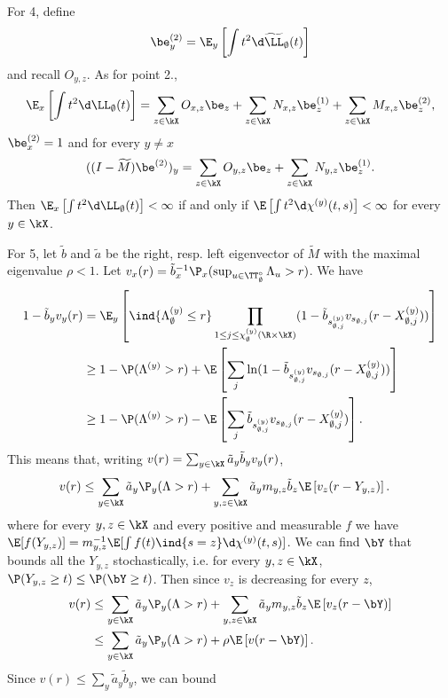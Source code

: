 \documentclass[10pt,a4paper]{article}
\newcommand{\wM}{\widetilde{M}}
\renewcommand{\kx}{s}
\begin{document}
For 4, define
\[ \be^{(2)}_y = \E_y\left[\int t^2 \d\widetilde\LL_\emptyset(t)\right] \]
and recall $O_{y,z}$. 
As for point 2., 
\[ \E_x\left[ \int t^2 \d\LL_\emptyset(t) \right] = \sum_{z\in\kX} O_{x,z} \be_z + \sum_{z\in\kX} N_{x,z} \be^{(1)}_z + \sum_{z\in\kX} M_{x,z} \be^{(2)}_z , \]
$\be^{(2)}_x = 1$ and for every $y\neq x$
\[ ((I-\wM) \be^{(2)})_y = \sum_{z\in\kX} O_{y,z} \be_z + \sum_{z\in\kX} N_{y,z} \be^{(1)}_z . \]
Then $\E_x\left[\int t^2\d\LL_\emptyset(t)\right]<\infty$ if and only if $\E\left[\int t^2 \d\chi^{(y)}(t,\kx)\right]<\infty$ for every $y\in\kX$. 


For 5, let $\tilde b$ and $\tilde a$ be the right, resp. left eigenvector of $\wM$ with the maximal eigenvalue $\rho<1$. 
Let $v_x(r) = \tilde b_x^{-1} \P_x(\sup_{u\in\TT^\circ_\emptyset} \Lambda_u > r)$. We have
\begin{align*}
1-\tilde b_y v_y(r) &= \E_y\left[\ind{\Lambda^{(y)}_{\emptyset}\leq r} \prod_{1\leq j \leq\chi^{(y)}_\emptyset(\R\times\kX)} (1-\tilde b_{\kx^{(y)}_{\emptyset,j}} v_{\kx_{\emptyset,j}}(r-X^{(y)}_{\emptyset,j})) \right] \\
&\geq 1 - \P(\Lambda^{(y)}>r) + \E\left[ \sum_j \ln(1-\tilde b_{\kx^{(y)}_{\emptyset,j}} v_{\kx_{\emptyset,j}}(r-X^{(y)}_{\emptyset,j})) \right] \\
&\geq 1 - \P(\Lambda^{(y)}>r) - \E\left[ \sum_j \tilde b_{\kx^{(y)}_{\emptyset,j}} v_{\kx_{\emptyset,j}}(r-X^{(y)}_{\emptyset,j}) \right] .
\end{align*}
This means that, writing $v(r) = \sum_{y\in\kX} \tilde a_y \tilde b_y v_y(r)$, 
\begin{align*}
v(r) &\leq \sum_{y\in\kX} \tilde a_y \P_y(\Lambda>r) + \sum_{y,z\in\kX} \tilde a_y m_{y,z} \tilde b_z \E\left[v_z(r-Y_{y,z})\right] .
\end{align*}
where for every $y,z\in\kX$ and every positive and measurable $f$ we have $\E[f(Y_{y,z})] = m_{y,z}^{-1} \E[\int f(t) \ind{\kx=z} \d\chi^{(y)}(t,\kx)]$. We can find $\bY$ that bounds all the $Y_{y,z}$ stochastically, i.e. for every $y,z\in\kX$, $\P(Y_{y,z}\geq t) \leq \P(\bY\geq t)$. Then since $v_z$ is decreasing for every $z$, 
\begin{align*}
v(r) &\leq \sum_{y\in\kX} \tilde a_y \P_y(\Lambda>r) + \sum_{y,z\in\kX} \tilde a_y m_{y,z} \tilde b_z \E\left[v_z(r-\bY)\right] \\
&\leq \sum_{y\in\kX} \tilde a_y \P_y(\Lambda>r) + \rho \E\left[v(r-\bY)\right] .
\end{align*}
Since $v(r) \leq \sum_y \tilde a_y \tilde b_y$, we can bound
\end{document}

